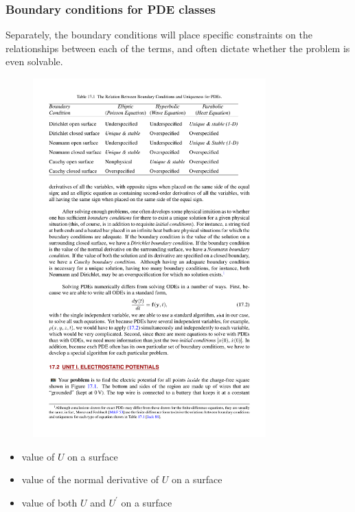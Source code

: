 \documentclass[hyperref={colorlinks=true}]{beamer}
\begin{document}
\begin{frame}%
  \frametitle{Boundary conditions for PDE classes}

  Separately, the boundary conditions will place specific constraints on the relationships between each of the terms, and often dictate whether the problem is even solvable.
  
  \begin{figure}
    \includegraphics[width=0.8\textwidth]{BoundaryConditions.pdf}
  \end{figure}
  
  \begin{itemize}
    \item {} value of $U$ on a surface
    \item {} value of the normal derivative of $U$ on a surface
    \item {} value of both $U$ and $U^{\prime}$ on a surface 
  \end{itemize}


\end{frame}
\end{document}
